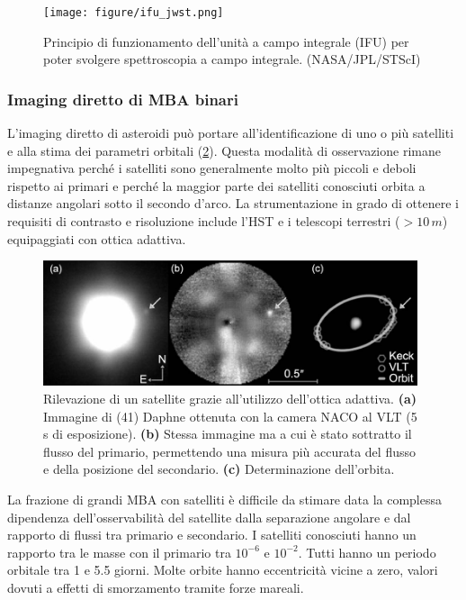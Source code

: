 \documentclass[a4paper,11pt,openright]{book}
\begin{document}
\begin{figure}[!h]
    \centering
    \texttt{[image: figure/ifu\_jwst.png]}
    \caption[Principio di funzionamento dell'unità a campo integrale (IFU) per IFS.]{Principio di funzionamento dell'unità a campo integrale (IFU) per poter svolgere spettroscopia a campo integrale. (NASA/JPL/STScI)}
    \label{fig:ifu_jwst}
\end{figure}

\subsubsection{Imaging diretto di MBA binari}
L'imaging diretto di asteroidi può portare all'identificazione di uno o più satelliti e alla stima dei parametri orbitali (\cref{fig:binaries_direct_imaging}). Questa modalità di osservazione rimane impegnativa perché i satelliti sono generalmente molto più piccoli e deboli rispetto ai primari e perché la maggior parte dei satelliti conosciuti orbita a distanze angolari sotto il secondo d'arco. La strumentazione in grado di ottenere i requisiti di contrasto e risoluzione include l'HST e i telescopi terrestri ($>10\,m$) equipaggiati con ottica adattiva.

\begin{figure}[!h]
    \centering
    \includegraphics[width=0.98\textwidth]{figure/binaries_direct_imaging.jpg}
    \caption[Rilevazione del satellite di (41) Daphne grazie all'uso dell'ottica adattiva.]{Rilevazione di un satellite grazie all'utilizzo dell'ottica adattiva. \textbf{(a)} Immagine di (41) Daphne ottenuta con la camera NACO al VLT (5 s di esposizione). \textbf{(b)} Stessa immagine ma a cui è stato sottratto il flusso del primario, permettendo una misura più accurata del flusso e della posizione del secondario. \textbf{(c)} Determinazione dell'orbita. \citep{carry_ao_2009}}
    \label{fig:binaries_direct_imaging}
\end{figure}

La frazione di grandi MBA con satelliti è difficile da stimare data la complessa dipendenza dell'osservabilità del satellite dalla separazione angolare e dal rapporto di flussi tra primario e secondario. I satelliti conosciuti hanno un rapporto tra le masse con il primario tra $10^{-6}$ e $10^{-2}$. Tutti hanno un periodo orbitale tra 1 e 5.5 giorni. Molte orbite hanno eccentricità vicine a zero, valori dovuti a effetti di smorzamento tramite forze mareali.
\end{document}
